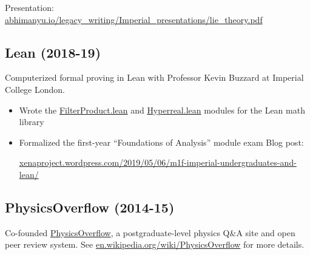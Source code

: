 \documentclass{article}
\newenvironment{relatedwork}
   {
     \begin{mdframed}[
       leftmargin=1cm,
       rightmargin=0cm,
       innerleftmargin=10pt,
       innerrightmargin=0pt,
       innertopmargin=0.5em,
       innerbottommargin=0.5em,
       linewidth=1pt,
       linecolor=gray,
       topline=false,
       bottomline=false,
       rightline=false
     ]
     \footnotesize
   }
   {
     \end{mdframed}
   }
\begin{document}
Presentation: \href{https://abhimanyu.io/legacy_writing/Imperial_presentations/lie_theory.pdf}{abhimanyu.io/legacy\_writing/Imperial\_presentations/lie\_theory.pdf}



\subsection*{Lean (2018-19)}

Computerized formal proving in Lean with Professor Kevin Buzzard at Imperial College London.

\begin{itemize}
    \item Wrote the \href{https://github.com/leanprover-community/mathlib4/blob/3a7e6bb77ec51d8009107923a4c071a9473ecc5c/Mathlib/Order/Filter/FilterProduct.lean}{FilterProduct.lean} and \href{https://github.com/leanprover-community/mathlib4/blob/3a7e6bb77ec51d8009107923a4c071a9473ecc5c/Mathlib/Data/Real/Hyperreal.lean}{Hyperreal.lean} modules for the Lean math library
    \item Formalized the first-year ``Foundations of Analysis'' module exam Blog post:

          \href{https://xenaproject.wordpress.com/2019/05/06/m1f-imperial-undergraduates-and-lean/}{xenaproject.wordpress.com/2019/05/06/m1f-imperial-undergraduates-and-lean/}
\end{itemize}

\subsection*{PhysicsOverflow (2014-15)}

Co-founded \href{https://physicsoverflow.org}{PhysicsOverflow}, a postgraduate-level physics Q\&A site and open peer review system. See \href{https://en.wikipedia.org/wiki/PhysicsOverflow}{en.wikipedia.org/wiki/PhysicsOverflow} for more details.
\end{document}

